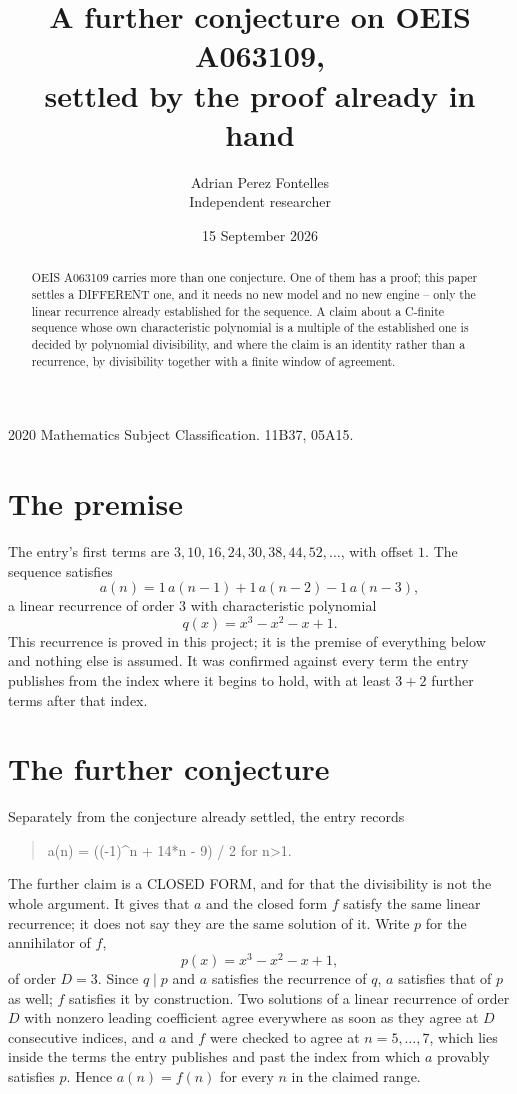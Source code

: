 \documentclass[11pt,a4paper]{article}
\title{A further conjecture on OEIS A063109,\\ \large settled by the proof already in hand}
\author{Adrian Perez Fontelles\\ \small Independent researcher}
\date{15 September 2026}
\theoremstyle{plain}
\theoremstyle{definition}
\begin{document}
\maketitle

\begin{abstract}
OEIS A063109 carries more than one conjecture. One of them has a proof; this paper settles a
DIFFERENT one, and it needs no new model and no new engine -- only the linear recurrence already
established for the sequence. A claim about a C-finite sequence whose own characteristic
polynomial is a multiple of the established one is decided by polynomial divisibility, and where
the claim is an identity rather than a recurrence, by divisibility together with a finite window
of agreement.
\end{abstract}

\noindent\small 2020 Mathematics Subject Classification. 11B37, 05A15.\normalsize

\section{The premise}

The entry's first terms are $3, 10, 16, 24, 30, 38, 44, 52,\dots$, with offset $1$. The sequence satisfies
\[
  a(n)=1\,a(n-1) + 1\,a(n-2) - 1\,a(n-3) ,
\]
a linear recurrence of order $3$ with characteristic polynomial
\[
  q(x)=x^{3} - x^{2} - x + 1 .
\]
This recurrence is proved in this project; it is the premise of everything below and nothing else is assumed.
It was confirmed against every term the entry publishes from the index where it begins to hold,
with at least $3+2$ further terms after that index.

\section{The further conjecture}

Separately from the conjecture already settled, the entry records

\begin{quote}\raggedright a(n) = ((-1)\^{}n + 14*n - 9) / 2 for n>1.\end{quote}

The further claim is a CLOSED FORM, and for that the divisibility is not the whole argument. It
gives that $a$ and the closed form $f$ satisfy the same linear recurrence; it does not say they
are the same solution of it. Write $p$ for the annihilator of $f$,
\[
  p(x)=x^{3} - x^{2} - x + 1 ,
\]
of order $D=3$. Since $q\mid p$ and $a$ satisfies the recurrence of $q$, $a$ satisfies that of
$p$ as well; $f$ satisfies it by construction. Two solutions of a linear recurrence of order $D$
with nonzero leading coefficient agree everywhere as soon as they agree at $D$ consecutive
indices, and $a$ and $f$ were checked to agree at $n=5,\dots,7$,
which lies inside the terms the entry publishes and past the index from which $a$ provably
satisfies $p$. Hence $a(n)=f(n)$ for every $n$ in the claimed range.
\end{document}
